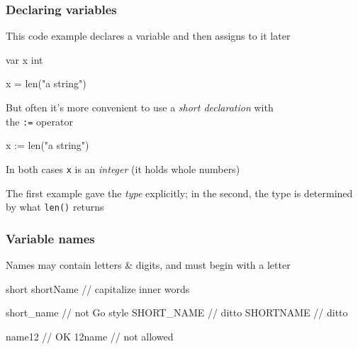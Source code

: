 \documentclass[handout,compress,t,11pt]{beamer}
\begin{document}
\begin{frame}[fragile]
\frametitle{Declaring variables}
This code example declares a variable and then assigns
to it later
\begin{golang}
var x int

x = len("a string")
\end{golang}
\vspace{0.5\baselineskip}
But often it's more convenient to use a {\em short declaration} with \\
the \verb|:=| operator
\begin{golang}
x := len("a string")
\end{golang}
    \vspace{0.5\baselineskip}
In both cases \verb|x| is an {\em integer} (it holds whole numbers) \par
    \vspace{0.5\baselineskip}
The first example gave the {\em type} explicitly; in the second, the type
is determined by what \verb|len()| returns
\end{frame}


\begin{frame}[fragile]
\frametitle{Variable names}
Names may contain letters \& digits, and must begin with a letter
\begin{golang}
short
shortName            // capitalize inner words

short_name           // not Go style
SHORT_NAME           // ditto
SHORTNAME            // ditto

name12               // OK
12name               // not allowed
\end{golang}
\end{frame}
\end{document}
